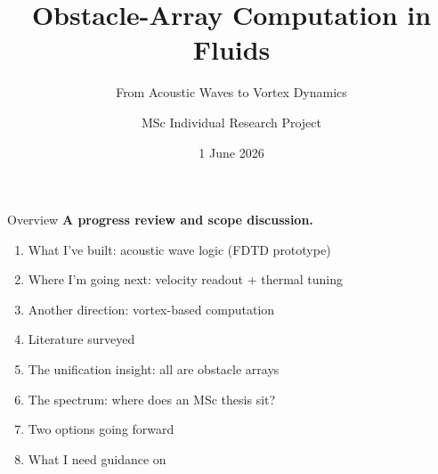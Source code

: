 \documentclass[aspectratio=169,11pt]{beamer}
\title{Obstacle-Array Computation in Fluids}
\subtitle{From Acoustic Waves to Vortex Dynamics}
\author{MSc Individual Research Project}
\institute{Cranfield University\hspace{0.3cm}|\hspace{0.3cm}Supervisors: Prof. Weisi Guo, Prof. Takis Tsoutsanis}
\date{1 June 2026}
\begin{document}
\begin{frame}[plain]
  \titlepage
\end{frame}

\begin{frame}{Overview}
  \textbf{A progress review and scope discussion.}

  \vspace{0.4cm}
  \begin{enumerate}
    \item What I've built: acoustic wave logic (FDTD prototype)
    \item Where I'm going next: velocity readout + thermal tuning
    \item Another direction: vortex-based computation
    \item Literature surveyed
    \item The unification insight: all are obstacle arrays
    \item The spectrum: where does an MSc thesis sit?
    \item Two options going forward
    \item What I need guidance on
  \end{enumerate}
\end{frame}
\end{document}
